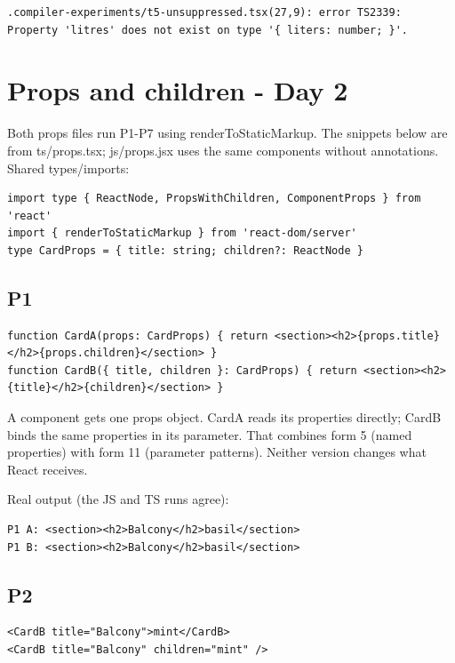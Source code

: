 \documentclass[
  10pt,
  a4paper,
]{article}
\begin{document}
\begin{lstlisting}
.compiler-experiments/t5-unsuppressed.tsx(27,9): error TS2339: Property 'litres' does not exist on type '{ liters: number; }'.
\end{lstlisting}

\section{Props and children - Day 2}\label{props-and-children---day-2}

Both props files run P1-P7 using renderToStaticMarkup. The snippets
below are from ts/props.tsx; js/props.jsx uses the same components
without annotations. Shared types/imports:

\begin{lstlisting}
import type { ReactNode, PropsWithChildren, ComponentProps } from 'react'
import { renderToStaticMarkup } from 'react-dom/server'
type CardProps = { title: string; children?: ReactNode }
\end{lstlisting}

\subsection{P1}\label{p1}

\begin{lstlisting}
function CardA(props: CardProps) { return <section><h2>{props.title}</h2>{props.children}</section> }
function CardB({ title, children }: CardProps) { return <section><h2>{title}</h2>{children}</section> }
\end{lstlisting}

A component gets one props object. CardA reads its properties directly;
CardB binds the same properties in its parameter. That combines form 5
(named properties) with form 11 (parameter patterns). Neither version
changes what React receives.

Real output (the JS and TS runs agree):

\begin{lstlisting}
P1 A: <section><h2>Balcony</h2>basil</section>
P1 B: <section><h2>Balcony</h2>basil</section>
\end{lstlisting}

\subsection{P2}\label{p2}

\begin{lstlisting}
<CardB title="Balcony">mint</CardB>
<CardB title="Balcony" children="mint" />
\end{lstlisting}
\end{document}
